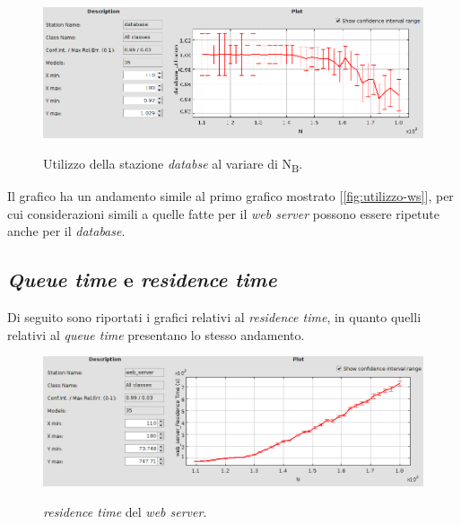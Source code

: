 \documentclass[../main.tex]{subfiles}
\begin{document}
    \begin{figure}[H]
        \centering
        \includegraphics[scale = 0.5]{assets/utilization_db.png}\\
        \caption[\textit{Utilizzo} della stazione \textit{database}]{Utilizzo della stazione\textit{
            databse} al variare di N\textsubscript{B}.}
        \label{fig:utilizzo-db}
    \end{figure}
    Il grafico ha un andamento simile al primo grafico mostrato [\ref{fig:utilizzo-ws}], per cui
    considerazioni simili   a quelle fatte per il \textit{web server} possono essere ripetute anche per il \textit{database}.

    \subsection{\textit{Queue time} e \textit{residence time}}\label{subsec:queue-time-e-residence-time}
    Di seguito sono riportati i grafici relativi al \textit{residence time}, in quanto quelli relativi al \textit{queue time}
    presentano lo stesso andamento.
    \begin{figure}[H]
        \centering
        \includegraphics[scale = 0.5]{assets/residence_ws.png}\\
        \caption[\textit{Residence time} del \textit{web server}]{\textit{residence time} del \textit{web server}.}
        \label{fig:residence-time-ws}
    \end{figure}
\end{document}
